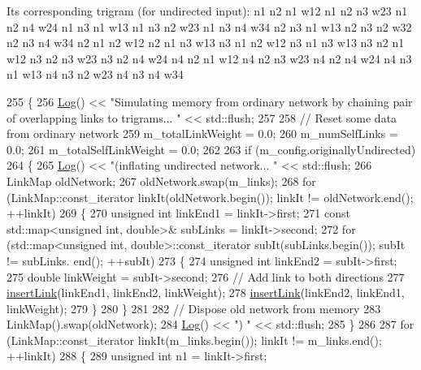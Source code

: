 Its corresponding trigram (for undirected input)\+: n1 n2 n1 w12 n1 n2 n3 w23 n1 n2 n4 w24 n1 n3 n1 w13 n1 n3 n2 w23 n1 n3 n4 w34 n2 n3 n1 w13 n2 n3 n2 w32 n2 n3 n4 w34 n2 n1 n2 w12 n2 n1 n3 w13 n3 n1 n2 w12 n3 n1 n3 w13 n3 n2 n1 w12 n3 n2 n3 w23 n3 n2 n4 w24 n4 n2 n1 w12 n4 n2 n3 w23 n4 n2 n4 w24 n4 n3 n1 w13 n4 n3 n2 w23 n4 n3 n4 w34 
\begin{DoxyCode}
255 \{
256     \mbox{\hyperlink{classLog}{Log}}() << \textcolor{stringliteral}{"Simulating memory from ordinary network by chaining pair of overlapping links to
       trigrams... "} << std::flush;
257 
258     \textcolor{comment}{// Reset some data from ordinary network}
259     m\_totalLinkWeight = 0.0;
260     m\_numSelfLinks = 0.0;
261     m\_totalSelfLinkWeight = 0.0;
262 
263     \textcolor{keywordflow}{if} (m\_config.originallyUndirected)
264     \{
265         \mbox{\hyperlink{classLog}{Log}}() << \textcolor{stringliteral}{"(inflating undirected network... "} << std::flush;
266         LinkMap oldNetwork;
267         oldNetwork.swap(m\_links);
268         \textcolor{keywordflow}{for} (LinkMap::const\_iterator linkIt(oldNetwork.begin()); linkIt != oldNetwork.end(); ++linkIt)
269         \{
270             \textcolor{keywordtype}{unsigned} \textcolor{keywordtype}{int} linkEnd1 = linkIt->first;
271             \textcolor{keyword}{const} std::map<unsigned int, double>& subLinks = linkIt->second;
272             \textcolor{keywordflow}{for} (std::map<unsigned int, double>::const\_iterator subIt(subLinks.begin()); subIt != subLinks.
      end(); ++subIt)
273             \{
274                 \textcolor{keywordtype}{unsigned} \textcolor{keywordtype}{int} linkEnd2 = subIt->first;
275                 \textcolor{keywordtype}{double} linkWeight = subIt->second;
276                 \textcolor{comment}{// Add link to both directions}
277                 \mbox{\hyperlink{classNetwork_ace5fa3249715ed1b840fa733976aa57b}{insertLink}}(linkEnd1, linkEnd2, linkWeight);
278                 \mbox{\hyperlink{classNetwork_ace5fa3249715ed1b840fa733976aa57b}{insertLink}}(linkEnd2, linkEnd1, linkWeight);
279             \}
280         \}
281 
282         \textcolor{comment}{// Dispose old network from memory}
283         LinkMap().swap(oldNetwork);
284         \mbox{\hyperlink{classLog}{Log}}() << \textcolor{stringliteral}{") "} << std::flush;
285     \}
286 
287     \textcolor{keywordflow}{for} (LinkMap::const\_iterator linkIt(m\_links.begin()); linkIt != m\_links.end(); ++linkIt)
288     \{
289         \textcolor{keywordtype}{unsigned} \textcolor{keywordtype}{int} n1 = linkIt->first;

\end{DoxyCode}

